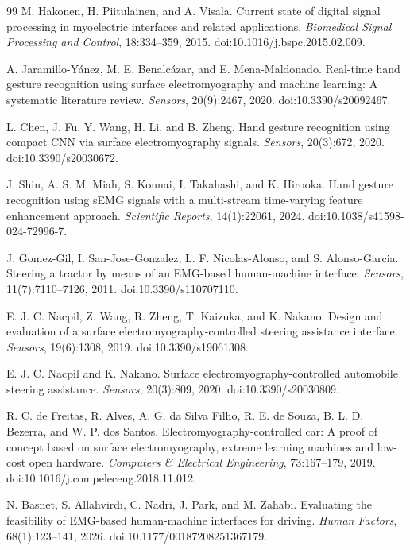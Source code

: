 \documentclass[11pt]{article}
\begin{document}
\begin{thebibliography}{99}
M. Hakonen, H. Piitulainen, and A. Visala.
\newblock Current state of digital signal processing in myoelectric interfaces and related applications.
\newblock \emph{Biomedical Signal Processing and Control}, 18:334--359, 2015.
\newblock doi:10.1016/j.bspc.2015.02.009.

A. Jaramillo-Y\'anez, M. E. Benalc\'azar, and E. Mena-Maldonado.
\newblock Real-time hand gesture recognition using surface electromyography and machine learning: A systematic literature review.
\newblock \emph{Sensors}, 20(9):2467, 2020.
\newblock doi:10.3390/s20092467.

L. Chen, J. Fu, Y. Wang, H. Li, and B. Zheng.
\newblock Hand gesture recognition using compact CNN via surface electromyography signals.
\newblock \emph{Sensors}, 20(3):672, 2020.
\newblock doi:10.3390/s20030672.

J. Shin, A. S. M. Miah, S. Konnai, I. Takahashi, and K. Hirooka.
\newblock Hand gesture recognition using sEMG signals with a multi-stream time-varying feature enhancement approach.
\newblock \emph{Scientific Reports}, 14(1):22061, 2024.
\newblock doi:10.1038/s41598-024-72996-7.

J. Gomez-Gil, I. San-Jose-Gonzalez, L. F. Nicolas-Alonso, and S. Alonso-Garcia.
\newblock Steering a tractor by means of an EMG-based human-machine interface.
\newblock \emph{Sensors}, 11(7):7110--7126, 2011.
\newblock doi:10.3390/s110707110.

E. J. C. Nacpil, Z. Wang, R. Zheng, T. Kaizuka, and K. Nakano.
\newblock Design and evaluation of a surface electromyography-controlled steering assistance interface.
\newblock \emph{Sensors}, 19(6):1308, 2019.
\newblock doi:10.3390/s19061308.

E. J. C. Nacpil and K. Nakano.
\newblock Surface electromyography-controlled automobile steering assistance.
\newblock \emph{Sensors}, 20(3):809, 2020.
\newblock doi:10.3390/s20030809.

R. C. de Freitas, R. Alves, A. G. da Silva Filho, R. E. de Souza, B. L. D. Bezerra, and W. P. dos Santos.
\newblock Electromyography-controlled car: A proof of concept based on surface electromyography, extreme learning machines and low-cost open hardware.
\newblock \emph{Computers \& Electrical Engineering}, 73:167--179, 2019.
\newblock doi:10.1016/j.compeleceng.2018.11.012.

N. Basnet, S. Allahvirdi, C. Nadri, J. Park, and M. Zahabi.
\newblock Evaluating the feasibility of EMG-based human-machine interfaces for driving.
\newblock \emph{Human Factors}, 68(1):123--141, 2026.
\newblock doi:10.1177/00187208251367179.
\end{thebibliography}
\end{document}
